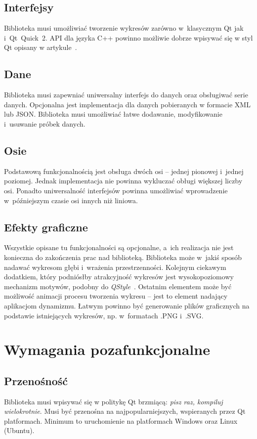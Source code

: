 \documentclass[11pt,twoside,a4paper,final]{llncs}
\begin{document}
\subsection{Interfejsy}
Biblioteka musi umożliwiać tworzenie wykresów zarówno w~klasycznym Qt jak i~Qt~Quick~2. API dla języka C++ powinno możliwie dobrze wpisywać się w styl Qt opisany w artykule~\cite{qt-style-API}.

\subsection{Dane}
Biblioteka musi zapewniać uniwersalny interfejs do danych oraz obsługiwać serie danych. Opcjonalna jest implementacja dla danych pobieranych w formacie XML lub JSON. Biblioteka musi umożliwiać łatwe dodawanie, modyfikowanie i~usuwanie próbek danych.

\subsection{Osie}
Podstawową funkcjonalnością jest obsługa dwóch osi -- jednej pionowej i~jednej poziomej. Jednak implementacja nie powinna wykluczać obługi większej liczby osi. Ponadto uniwersalność interfejsów powinna umożliwiać wprowadzenie w~późniejszym czasie osi innych niż liniowa.

\subsection{Efekty graficzne}
Wszystkie opisane tu funkcjonalności są opcjonalne, a~ich realizacja nie jest konieczna do zakończenia prac nad biblioteką.\newline
Biblioteka może w~jakiś sposób nadawać wykresom głębi i~wrażenia przestrzenności. Kolejnym ciekawym dodatkiem, który podniósłby atrakcyjność wykresów jest wysokopoziomowy mechanizm motywów, podobny do \textit{QStyle}~\cite{qstyle}. Ostatnim elementem może być możliwość animacji procesu tworzenia wykresu -- jest to element nadający aplikacjom dynamizmu. Łatwym powinno być generowanie plików graficznych na podstawie istniejących wykresów, np. w~formatach .PNG i~.SVG.


\section{Wymagania pozafunkcjonalne}

\subsection{Przenośność}
Biblioteka musi wpisywać się w politykę Qt brzmiącą: \textit{pisz raz, kompiluj wielokrotnie}. Musi być przenośna na najpopularniejszych, wspieranych przez Qt platformach. Minimum to uruchomienie na platformach Windows oraz Linux (Ubuntu).
\end{document}
